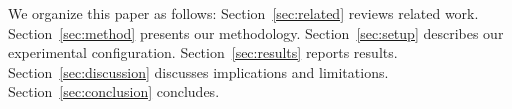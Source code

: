 We organize this paper as follows: Section~\ref{sec:related} reviews related work. Section~\ref{sec:method} presents our methodology. Section~\ref{sec:setup} describes our experimental configuration. Section~\ref{sec:results} reports results. Section~\ref{sec:discussion} discusses implications and limitations. Section~\ref{sec:conclusion} concludes.
